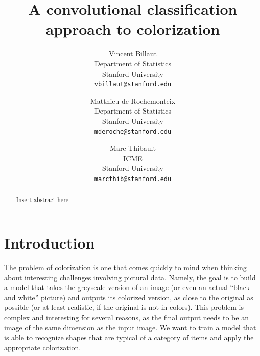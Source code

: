\documentclass[10pt,twocolumn,letterpaper]{article}
\begin{document}
\title{A convolutional classification approach to colorization}

\author{Vincent Billaut\\
Department of Statistics\\
Stanford University\\
{\tt\small vbillaut@stanford.edu}
\and
Matthieu de Rochemonteix\\
Department of Statistics\\
Stanford University\\
{\tt\small mderoche@stanford.edu}
\and
Marc Thibault\\
ICME\\
Stanford University\\
{\tt\small marcthib@stanford.edu}
}

\maketitle



\begin{abstract}
Insert abstract here
\end{abstract}

\section*{Introduction}

The problem of colorization is one that comes quickly to mind when thinking about interesting challenges involving pictural data. Namely, the goal is to build a model that takes the greyscale version of an image (or even an actual ``black and white'' picture) and outputs its colorized version, as close to the original as possible (or at least realistic, if the original is not in colors). This problem is complex and interesting for several reasons, as the final output needs to be an image of the same dimension as the input image. We want to train a model that is able to recognize shapes that are typical of a category of items and apply the appropriate colorization. 
\end{document}
